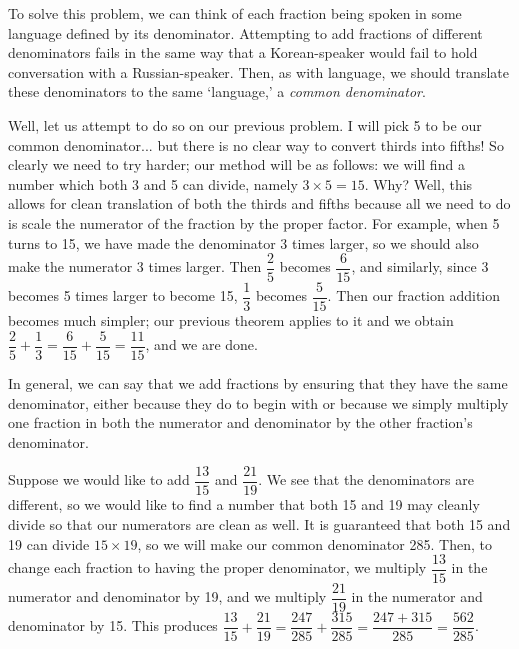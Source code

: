 \documentclass[openany]{book}
\begin{document}
To solve this problem, we can think of each fraction being spoken in some language defined by its denominator. Attempting to add fractions of different denominators fails in the same way that a Korean-speaker would fail to hold conversation with a Russian-speaker. Then, as with language, we should translate these denominators to the same `language,' a \textit{common denominator}.\par
Well, let us attempt to do so on our previous problem. I will pick 5 to be our common denominator... but there is no clear way to convert thirds into fifths! So clearly we need to try harder; our method will be as follows: we will find a number which both 3 and 5 can divide, namely $3\times5=15$. Why? Well, this allows for clean translation of both the thirds and fifths because all we need to do is scale the numerator of the fraction by the proper factor. For example, when 5 turns to 15, we have made the denominator 3 times larger, so we should also make the numerator 3 times larger. Then $\dfrac{2}{5}$ becomes $\dfrac{6}{15}$, and similarly, since 3 becomes 5 times larger to become 15, $\dfrac{1}{3}$ becomes $\dfrac{5}{15}$. Then our fraction addition becomes much simpler; our previous theorem applies to it and we obtain $\dfrac{2}{5}+\dfrac{1}{3}=\dfrac{6}{15}+\dfrac{5}{15}=\dfrac{11}{15}$, and we are done.\par
In general, we can say that we add fractions by ensuring that they have the same denominator, either because they do to begin with or because we simply multiply one fraction in both the numerator and denominator by the other fraction's denominator.
\begin{example}
	Suppose we would like to add $\dfrac{13}{15}$ and $\dfrac{21}{19}$. We see that the denominators are different, so we would like to find a number that both 15 and 19 may cleanly divide so that our numerators are clean as well. It is guaranteed that both 15 and 19 can divide $15\times19$, so we will make our common denominator 285. Then, to change each fraction to having the proper denominator, we multiply $\dfrac{13}{15}$ in the numerator and denominator by 19, and we multiply $\dfrac{21}{19}$ in the numerator and denominator by 15. This produces $\dfrac{13}{15}+\dfrac{21}{19}=\dfrac{247}{285}+\dfrac{315}{285}=\dfrac{247+315}{285}=\dfrac{562}{285}$.
\end{example}
\end{document}
